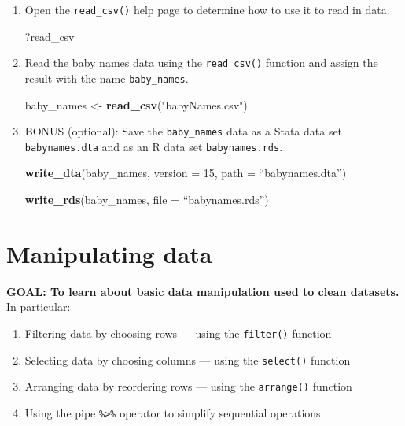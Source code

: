 \documentclass[]{book}
\newenvironment{Shaded}{\begin{snugshade}}{\end{snugshade}}
\newcommand{\DataTypeTok}[1]{\textcolor[rgb]{0.13,0.29,0.53}{#1}}
\newcommand{\DecValTok}[1]{\textcolor[rgb]{0.00,0.00,0.81}{#1}}
\newcommand{\KeywordTok}[1]{\textcolor[rgb]{0.13,0.29,0.53}{\textbf{#1}}}
\newcommand{\NormalTok}[1]{#1}
\newcommand{\StringTok}[1]{\textcolor[rgb]{0.31,0.60,0.02}{#1}}
\providecommand{\tightlist}{%
  \setlength{\itemsep}{0pt}\setlength{\parskip}{0pt}}
\begin{document}
\begin{enumerate}
\def\labelenumi{\arabic{enumi}.}
\item
  Open the \texttt{read\_csv()} help page to determine how to use it to read in data.

\begin{Shaded}
\begin{Highlighting}[]
\NormalTok{?read_csv}
\end{Highlighting}
\end{Shaded}
\item
  Read the baby names data using the \texttt{read\_csv()} function and assign the result with the name \texttt{baby\_names}.

\begin{Shaded}
\begin{Highlighting}[]
\NormalTok{baby_names <-}\StringTok{ }\KeywordTok{read_csv}\NormalTok{(}\StringTok{"babyNames.csv"}\NormalTok{)}
\end{Highlighting}
\end{Shaded}
\item
  BONUS (optional): Save the \texttt{baby\_names} data as a Stata data set \texttt{babynames.dta} and as an R data set \texttt{babynames.rds}.

\begin{Shaded}
\begin{Highlighting}[]
\KeywordTok{write_dta}\NormalTok{(baby_names, }\DataTypeTok{version =} \DecValTok{15}\NormalTok{, }\DataTypeTok{path =}\NormalTok{ “babynames.dta”)}

\KeywordTok{write_rds}\NormalTok{(baby_names, }\DataTypeTok{file =}\NormalTok{ “babynames.rds”)}
\end{Highlighting}
\end{Shaded}
\end{enumerate}

\hypertarget{manipulating-data}{%
\section{Manipulating data}\label{manipulating-data}}

\textbf{GOAL: To learn about basic data manipulation used to clean datasets.} In particular:

\begin{enumerate}
\def\labelenumi{\arabic{enumi}.}
\tightlist
\item
  Filtering data by choosing rows --- using the \texttt{filter()} function
\item
  Selecting data by choosing columns --- using the \texttt{select()} function
\item
  Arranging data by reordering rows --- using the \texttt{arrange()} function
\item
  Using the pipe \texttt{\%\textgreater{}\%} operator to simplify sequential operations
\end{enumerate}
\end{document}
